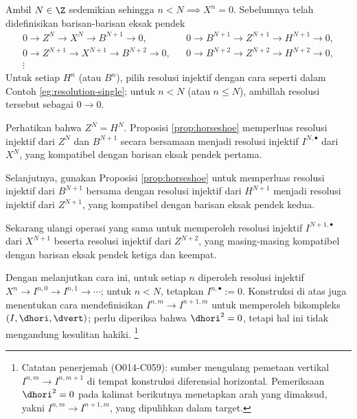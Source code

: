 \begin{bukti}
	Ambil $N \in \Z$ sedemikian sehingga $n < N \implies X^n = 0$. Sebelumnya telah didefinisikan barisan-barisan eksak pendek
	\begin{align*}
		0 \to Z^N \to X^N \to B^{N+1} \to 0, & & 0 \to B^{N+1} \to Z^{N+1} \to H^{N+1} \to 0, \\
		0 \to Z^{N+1} \to X^{N+1} \to B^{N+2} \to 0, & & 0 \to B^{N+2} \to Z^{N+2} \to H^{N+2} \to 0, \\
		\vdots & &
	\end{align*}
	Untuk setiap $H^n$ (atau $B^n$), pilih resolusi injektif dengan cara seperti dalam Contoh \ref{eg:resolution-single}; untuk $n < N$ (atau $n \leq N$), ambillah resolusi tersebut sebagai $0 \to 0$.
	\begin{compactitem}
		\item Perhatikan bahwa $Z^N = H^N$. Proposisi \ref{prop:horseshoe} memperluas resolusi injektif dari $Z^N$ dan $B^{N+1}$ secara bersamaan menjadi resolusi injektif $I^{N, \bullet}$ dari $X^N$, yang kompatibel dengan barisan eksak pendek pertama.
		\item Selanjutnya, gunakan Proposisi \ref{prop:horseshoe} untuk memperluas resolusi injektif dari $B^{N+1}$ bersama dengan resolusi injektif dari $H^{N+1}$ menjadi resolusi injektif dari $Z^{N+1}$, yang kompatibel dengan barisan eksak pendek kedua.
		\item Sekarang ulangi operasi yang sama untuk memperoleh resolusi injektif $I^{N+1, \bullet}$ dari $X^{N+1}$ beserta resolusi injektif dari $Z^{N+2}$, yang masing-masing kompatibel dengan barisan eksak pendek ketiga dan keempat.
	\end{compactitem}

	Dengan melanjutkan cara ini, untuk setiap $n$ diperoleh resolusi injektif $X^n \to I^{n, 0} \to I^{n,1} \to \cdots$; untuk $n < N$, tetapkan $I^{n, \bullet} := 0$. Konstruksi di atas juga menentukan cara mendefinisikan $I^{n,m} \to I^{n+1,m}$ untuk memperoleh bikompleks $(I, \dhori, \dvert)$; perlu diperiksa bahwa $\dhori^2 = 0$, tetapi hal ini tidak mengandung kesulitan hakiki.
\footnote{Catatan penerjemah (O014-C059): sumber mengulang pemetaan vertikal
$I^{n,m}\to I^{n,m+1}$ di tempat konstruksi diferensial horizontal.
Pemeriksaan $\dhori^2=0$ pada kalimat berikutnya menetapkan arah yang dimaksud,
yakni $I^{n,m}\to I^{n+1,m}$, yang dipulihkan dalam target.}
\end{bukti}

